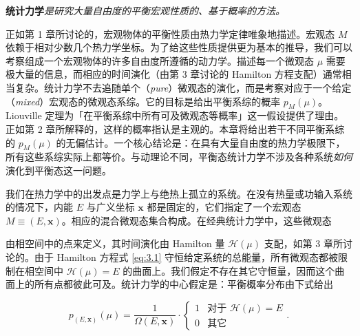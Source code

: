 

\textbf{统计力学}\emph{是研究大量自由度的平衡宏观性质的、基于概率的方法。}

正如第 1 章所讨论的，宏观物体的平衡性质由热力学定律唯象地描述。宏观态 $M$ 依赖于相对少数几个热力学坐标。为了给这些性质提供更为基本的推导，我们可以考察组成一个宏观物体的许多自由度所遵循的动力学。描述每一个微观态 $\mu$ 需要极大量的信息，而相应的时间演化（由第 3 章讨论的 Hamilton 方程支配）通常相当复杂。统计力学不去追随单个（\textit{pure}）微观态的演化，而是考察对应于一个给定（\textit{mixed}）宏观态的微观态系综。它的目标是给出平衡系综的概率 $p_M(\mu)$。Liouville 定理为「在平衡系综中所有可及微观态等概率」这一假设提供了理由。正如第 2 章所解释的，这样的概率指认是主观的。本章将给出若干不同平衡系综的 $p_M(\mu)$ 的无偏估计。一个核心结论是：在具有大量自由度的热力学极限下，所有这些系综实际上都等价。与动理论不同，平衡态统计力学不涉及各种系统\emph{如何}演化到平衡态这一问题。


我们在热力学中的出发点是力学上与绝热上孤立的系统。在没有热量或功输入系统的情况下，内能 $E$ 与广义坐标 $\mathbf x$ 都是固定的，它们指定了一个宏观态 $M\equiv(E,\mathbf x)$。相应的混合微观态集合构成。在经典统计力学中，这些微观态

由相空间中的点来定义，其时间演化由 Hamilton 量 $\mathscr H(\mu)$ 支配，如第 3 章所讨论的。由于 Hamilton 方程式 \eqref{eq:3.1} 守恒给定系统的总能量，所有微观态都被限制在相空间中 $\mathscr H(\mu)=E$ 的曲面上。我们假定不存在其它守恒量，因而这个曲面上的所有点都彼此可及。统计力学的中心假定是：平衡概率分布由下式给出

\begin{equation}\label{eq:4.1}
  p_{(E,\mathbf x)}(\mu)=\frac{1}{\Omega(E,\mathbf x)}\cdot
  \begin{cases}1 & \text{对于 }\mathscr H(\mu)=E\\ 0 & \text{其它}\end{cases}.
\end{equation}

